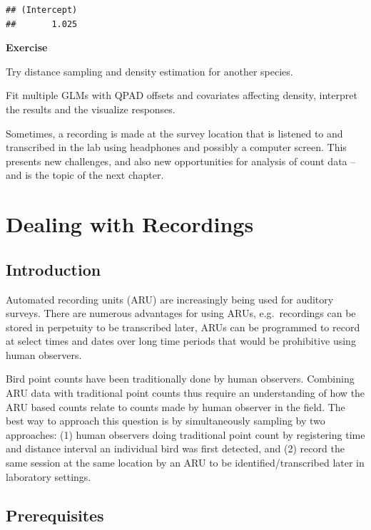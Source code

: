 \documentclass[12pt,]{book}
\let\BeginKnitrBlock\begin \let\EndKnitrBlock\end
\begin{document}
\begin{verbatim}
## (Intercept) 
##       1.025
\end{verbatim}

\BeginKnitrBlock{rmdexercise}
\textbf{Exercise}

Try distance sampling and density estimation for another species.

Fit multiple GLMs with QPAD offsets and covariates affecting density,
interpret the results and the visualize responses.
\EndKnitrBlock{rmdexercise}

Sometimes, a recording is made at the survey location
that is listened to and transcribed in the lab
using headphones and possibly a computer screen.
This presents new challenges, and also new opportunities
for analysis of count data -- and is the topic of the next chapter.

\hypertarget{recordings}{%
\chapter{Dealing with Recordings}\label{recordings}}

\hypertarget{introduction-4}{%
\section{Introduction}\label{introduction-4}}

Automated recording units (ARU) are increasingly being used for auditory
surveys. There are numerous advantages for using ARUs,
e.g.~recordings can be stored in perpetuity to be transcribed
later, ARUs can be programmed to record at select times and dates over long
time periods that would be prohibitive using human observers.

Bird point counts have been traditionally done by human observers. Combining
ARU data with traditional point counts thus require an understanding of
how the ARU based counts relate to counts made by human observer in the field.
The best way to approach this question is by simultaneously sampling
by two approaches: (1) human observers doing traditional point count
by registering time and distance interval an individual bird was first detected,
and (2) record the same session at the same location by an ARU to be
identified/transcribed later in laboratory settings.

\hypertarget{prerequisites-4}{%
\section{Prerequisites}\label{prerequisites-4}}
\end{document}
